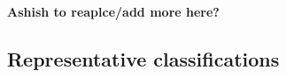 \textbf{Ashish to reaplce/add more here?}






\subsection{Representative classifications}
\label{sec:realresults}

